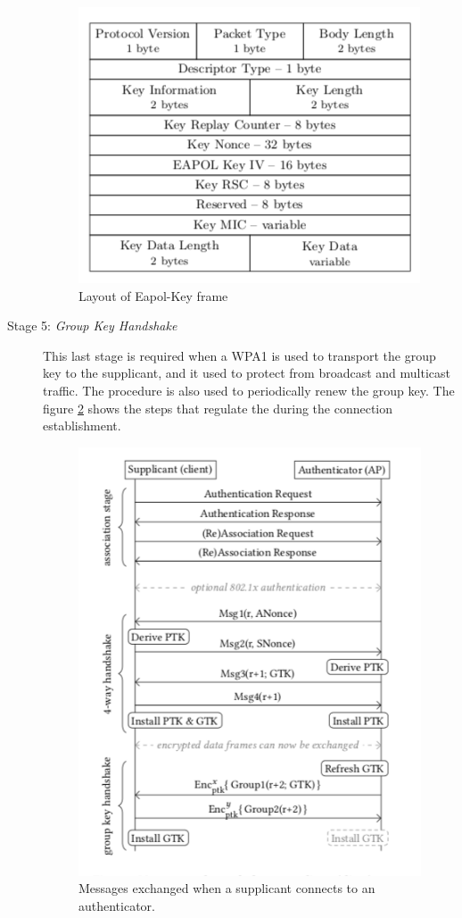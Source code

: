 \begin{description}
\begin{figure}[tbh]
  \centering
  \includegraphics[width=0.8\linewidth]{images/intro/eapol-frame.png}
  \caption[Layout of Eapol-Key frame]{Layout of Eapol-Key frame}
  \label{fig:eapol-frame}
\end{figure}


\item[Stage 5: \textit{Group Key Handshake}]

This last stage is required when a WPA1 is used to transport the group key to the supplicant, and it used to protect from broadcast and multicast traffic. 
The procedure is also used  to periodically renew the group key. The figure \ref{fig:mess-ex} shows the steps that regulate the \fwh during the connection establishment.\cite{VanhoefM2017Dlvi}

\begin{figure}[tbh]
  \centering
  \includegraphics[width=0.8\linewidth]{images/intro/mess-ex.png}
  \caption[Message exchange in \fwh]{Messages exchanged when a supplicant connects to an authenticator.}
  \label{fig:mess-ex}
\end{figure}



\end{description}

